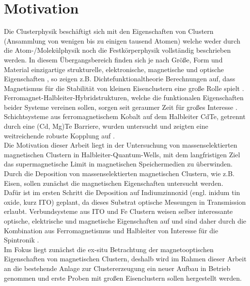 \chapter{Motivation}
Die Clusterphysik beschäftigt sich mit den Eigenschaften von Clustern (Ansammlung von wenigen bis zu einigen tausend Atomen) welche weder durch die Atom-/Molekülphysik noch die Festkörperphysik vollständig beschrieben werden.
In diesem Übergangsbereich finden sich je nach Größe, Form und Material einzigartige strukturelle, elektronische, magnetische und optische Eigenschaften \cite{Jena.1992}, so zeigen z.B. Dichtefunktionaltheorie Berechnungen auf, dass Magnetismus für die Stabilität von kleinen Eisenclustern eine große Rolle spielt \cite{Kim.2014}.\\
Ferromagnet-Halbleiter-Hybridstrukturen, welche die funktionalen Eigenschaften beider Systeme vereinen sollen, sorgen seit geraumer Zeit für großes Interesse \cite{Ohno.1998, Zakharchenya.2005, Dietl.2010}.
Schichtsysteme aus ferromagnetischem Kobalt auf dem Halbleiter CdTe, getrennt durch eine (Cd, Mg)Te Barriere, wurden untersucht und zeigten eine weitreichende robuste Kopplung auf \cite{Korenev.2016}.\\
Die Motivation dieser Arbeit liegt in der Untersuchung von massenselektierten magnetischen Clustern in Halbleiter-Quantum-Wells, mit dem langfristigen Ziel das supermagnetische Limit in magnetischen Speichermedien zu überwinden.
Durch die Deposition von massenselektierten magnetischen Clustern, wie z.B. Eisen, sollen zunächst die magnetischen Eigenschaften untersucht werden.\\
Dafür ist im ersten Schritt die Deposition auf Indiumzinnoxid (engl. inidum tin oxide, kurz ITO) geplant, da dieses Substrat optische Messungen in Transmission erlaubt.
Verbundsysteme aus ITO und Fe Clustern weisen selber interessante optische, elektrische und magnetische Eigenschaften auf und sind daher durch die Kombination aus Ferromagnetismus und Halbleiter von Interesse für die Spintronik \cite{Peng.2005, Ohno.2007, Shen.2015}.\\
Im Fokus liegt zunächst die ex-situ Betrachtung der magnetooptischen Eigenschaften von magnetischen Clustern, deshalb wird im Rahmen dieser Arbeit an die bestehende Anlage zur Clustererzeugung ein neuer Aufbau in Betrieb genommen und erste Proben mit großen Eisenclustern sollen hergestellt werden.